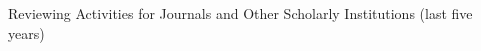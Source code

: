 {\subsec Reviewing Activities for Journals and Other Scholarly
Institutions (last five years)


























}

